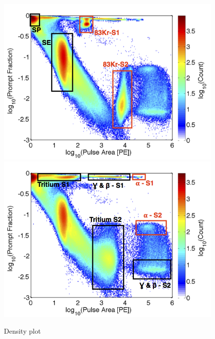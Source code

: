  \begin{figure}[h!]\centering
\includegraphics[width=120mm]{Chapter_LUX_Det/Kr_83_Density_text.png}
\includegraphics[width=120mm]{Chapter_LUX_Det/T_Density_text.png}
\caption{Density plot}
\label{fig:Prompt_Fraction}
\end{figure}


